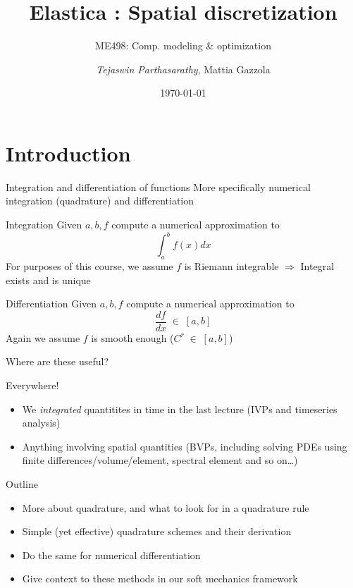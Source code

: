 \documentclass[presentation]{beamer}
\author{\emph{Tejaswin Parthasarathy}, Mattia Gazzola}
\date{\today}
\title{Elastica : Spatial discretization}
\subtitle{ME498: Comp. modeling \& optimization}
\begin{document}
\maketitle
\section{Introduction}
\label{sec:org783b98f}
\begin{frame}[label={sec:orgc2b18a6}]{Integration and differentiation of functions}
More specifically numerical integration (\alert{quadrature}) and differentiation
\begin{block}{Integration}
Given \(a, b, f\) compute a numerical approximation to
\[ \int_{a}^{b} f(x) dx \]
For purposes of this course, we assume \(f\) is Riemann integrable
  \(\Rightarrow\) Integral exists and is unique
\end{block}
\begin{block}{Differentiation}
Given \(a, b, f\) compute a numerical approximation to
\[ \frac{df}{dx} \; \in \; [a,b]\]
Again we assume \(f\) is smooth enough (\(C^{r}\;\in\;[a,b]\))
\end{block}
\end{frame}
\begin{frame}[label={sec:org11e870a}]{Where are these useful?}
\begin{block}{Everywhere!}
\begin{itemize}
\item We \emph{integrated} quantitites in time in the last lecture (IVPs and
timeseries analysis)
\item Anything involving spatial quantities (BVPs, including solving PDEs using
finite differences/volume/element, spectral element and so on\ldots{})
\end{itemize}
\end{block}
\end{frame}
\begin{frame}[label={sec:orgba16af2}]{Outline}
\begin{itemize}
\item More about quadrature, and what to look for in a quadrature rule
\item Simple (yet effective) quadrature schemes and their derivation
\item Do the same for numerical differentiation
\item Give context to these methods in our soft mechanics framework
\end{itemize}
\end{frame}
\end{document}
